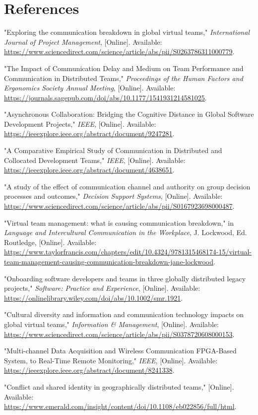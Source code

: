 \documentclass[12pt]{article}
\begin{document}
\section*{References}
\vspace*{-35pt}
\renewcommand{\refname}{}

\begin{thebibliography}{9}

"Exploring the communication breakdown in global virtual teams," \emph{International Journal of Project Management}, [Online]. Available: \url{https://www.sciencedirect.com/science/article/abs/pii/S0263786311000779}.

"The Impact of Communication Delay and Medium on Team Performance and Communication in Distributed Teams," \emph{Proceedings of the Human Factors and Ergonomics Society Annual Meeting}, [Online]. Available: \url{https://journals.sagepub.com/doi/abs/10.1177/1541931214581025}.

"Asynchronous Collaboration: Bridging the Cognitive Distance in Global Software Development Projects," \emph{IEEE}, [Online]. Available: \url{https://ieeexplore.ieee.org/abstract/document/9247281}.

"A Comparative Empirical Study of Communication in Distributed and Collocated Development Teams," \emph{IEEE}, [Online]. Available: \url{https://ieeexplore.ieee.org/abstract/document/4638651}.

"A study of the effect of communication channel and authority on group decision processes and outcomes," \emph{Decision Support Systems}, [Online]. Available: \url{https://www.sciencedirect.com/science/article/abs/pii/S0167923698000487}.

"Virtual team management: what is causing communication breakdown," in \emph{Language and Intercultural Communication in the Workplace}, J. Lockwood, Ed. Routledge, [Online]. Available: \url{https://www.taylorfrancis.com/chapters/edit/10.4324/9781315468174-15/virtual-team-management-causing-communication-breakdown-jane-lockwood}.

"Onboarding software developers and teams in three globally distributed legacy projects," \emph{Software: Practice and Experience}, [Online]. Available: \url{https://onlinelibrary.wiley.com/doi/abs/10.1002/smr.1921}.

"Cultural diversity and information and communication technology impacts on global virtual teams," \emph{Information \& Management}, [Online]. Available: \url{https://www.sciencedirect.com/science/article/abs/pii/S0378720608000153}.

"Multi-channel Data Acquisition and Wireless Communication FPGA-Based System, to Real-Time Remote Monitoring," \emph{IEEE}, [Online]. Available: \url{https://ieeexplore.ieee.org/abstract/document/8241338}.

"Conflict and shared identity in geographically distributed teams," [Online]. Available: \url{https://www.emerald.com/insight/content/doi/10.1108/eb022856/full/html}.

\end{thebibliography}
\newpage
\end{document}
